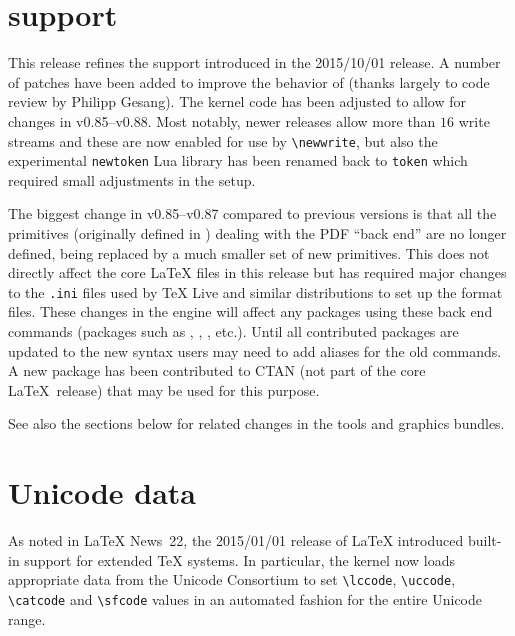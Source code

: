 \documentclass{ltnews}
\begin{document}
\maketitle

\tableofcontents

\section{ support}

This release refines the  support introduced in the
2015/10/01 release. A number of patches have been added to improve the
behavior of  (thanks largely to code review by Philipp Gesang).
The kernel code has been adjusted to
allow for changes in  v0.85--v0.88. Most notably, newer
 releases allow more than $16$ write streams and these are now
enabled for use by \verb|\newwrite|, but also the experimental
\texttt{newtoken} Lua library has been renamed back to \texttt{token}
which required small adjustments in the   setup.

The biggest change in   v0.85--v0.87 compared to previous
versions is that all the primitives (originally defined in
) dealing with the PDF ``back end''
are no longer defined, being replaced by a much smaller set of new primitives.
This does not directly affect the core \LaTeX{}
files in this release but has required major changes to the
\texttt{.ini} files used by \TeX{} Live and similar distributions to
set up the format files. These changes in the   engine
will affect any packages using these back end commands (packages such
as ,  ,  , etc.).
Until all contributed packages are updated to the new syntax users may
need to add aliases for the old  commands. A new
 package has been contributed to CTAN (not part of the
core \LaTeX\ release) that may be used for this purpose. 

See also the sections below for related changes in the
\textsf{tools} and \textsf{graphics} bundles.


\section{Unicode data}

As noted in \LaTeX{} News~22, the 2015/01/01 release of \LaTeX{} introduced
built-in support for extended \TeX{} systems. In particular, the kernel now
loads appropriate data from the Unicode Consortium to set \verb|\lccode|,
\verb|\uccode|, \verb|\catcode| and \verb|\sfcode| values in an automated
fashion for the entire Unicode range.
\end{document}
